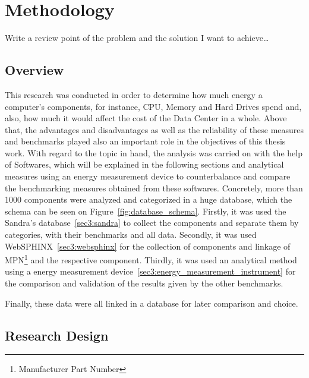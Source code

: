 

\chapter{Methodology} \label{chap3:methodology}

Write a review point of the problem and the solution I want to achieve\ldots

\section{Overview} \label{sec3:overview}
    This research was conducted in order to determine how much energy a computer's components, for instance, CPU, Memory and Hard Drives spend and, also, how much it would affect the cost of the Data Center in a whole. Above that, the advantages and disadvantages as well as the reliability of these measures and benchmarks played also an important role in the objectives of this thesis work. With regard to the topic in hand, the analysis was carried on with the help of Softwares, which will be explained in the following sections and analytical measures using an energy measurement device to counterbalance and compare the benchmarking measures obtained from these softwares. Concretely, more than 1000 components were analyzed and categorized in a huge database, which the schema can be seen on Figure~\ref{fig:database_schema}. Firstly, it was used the Sandra's database~\ref{sec3:sandra} to collect the components and separate them by categories, with their benchmarks and all data. Secondly, it was used WebSPHINX~\ref{sec3:websphinx} for the collection of components and linkage of MPN\footnote{Manufacturer Part Number} and the respective component. Thirdly, it was used an analytical method using a energy measurement device~\ref{sec3:energy_measurement_instrument} for the comparison and validation of the results given by the other benchmarks. 

    Finally, these data were all linked in a database for later comparison and choice. 

\section{Research Design} \label{sec3:research_design}

